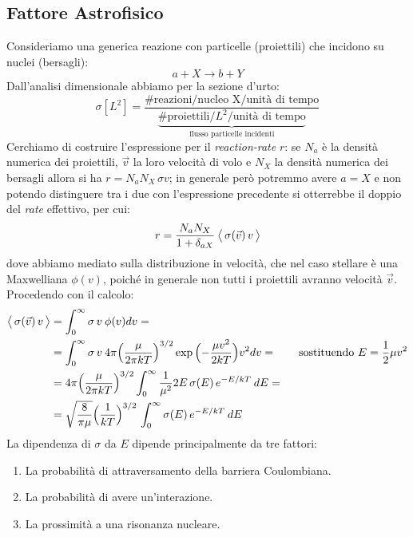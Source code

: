 \subsection{Fattore Astrofisico}
Consideriamo una generica reazione con particelle (proiettili) che incidono su nuclei (bersagli):
$$a+X\to b+Y$$
Dall'analisi dimensionale abbiamo per la sezione d'urto:
$$\sigma[L^2] = \frac{\# \text{reazioni}/\text{nucleo X}/\text{unità di tempo}}{\underbrace{\# \text{proiettili}/L^2/\text{unità di tempo}}_\text{flusso particelle incidenti}}$$
Cerchiamo di costruire l'espressione per il \textit{reaction-rate} $r$: se $N_a$ è la densità numerica dei proiettili, $\vec{v}$ la loro velocità di volo e $N_X$ la densità numerica dei bersagli allora si ha $r = N_a N_X\, \sigma v$; in generale però potremmo avere $a=X$ e non potendo distinguere tra i due con l'espressione precedente si otterrebbe il doppio del \textit{rate} effettivo, per cui: 
$$r = \frac{N_a N_X}{1+\delta_{aX}}\: \bigl\langle\, \sigma(\vec{v})\, v\, \bigr\rangle$$
dove abbiamo mediato sulla distribuzione in velocità, che nel caso stellare è una Maxwelliana $\phi(v)$, poiché in generale non tutti i proiettili avranno velocità $\vec{v}$. Procedendo con il calcolo:
\begin{displaymath}
\begin{aligned}
\bigl\langle\, \sigma(\vec{v})\, v\, \bigr\rangle &= \int_0^\infty \sigma \, v \: \phi(v) dv = \\
&= \int_0^\infty \sigma \, v \: 4\pi \Bigl ( \frac{\mu}{2\pi kT} \Bigr )^{3/2} \exp{\Bigl ( -\frac{\mu v^2}{2kT} \Bigr )} v^2 dv = \qquad \text{sostituendo } E= \frac{1}{2}\mu v^2\\
&= 4\pi \Bigl ( \frac{\mu}{2\pi kT} \Bigr )^{3/2} \int_0^\infty \frac{1}{\mu^2} 2E\, \sigma(E) \, e^{-E/kT} \: dE =\\
&= \sqrt{\frac{8}{\pi \mu}} \Bigl ( \frac{1}{kT} \Bigr )^{3/2} \, \int_0^\infty \sigma(E) \, e^{-E/kT} \: dE
\end{aligned}
\end{displaymath}
La dipendenza di $\sigma$ da $E$ dipende principalmente da tre fattori:
\begin{enumerate}
    \item La probabilità di attraversamento della barriera Coulombiana.
    \item La probabilità di avere un'interazione.
    \item La prossimità a una risonanza nucleare.
\end{enumerate}
